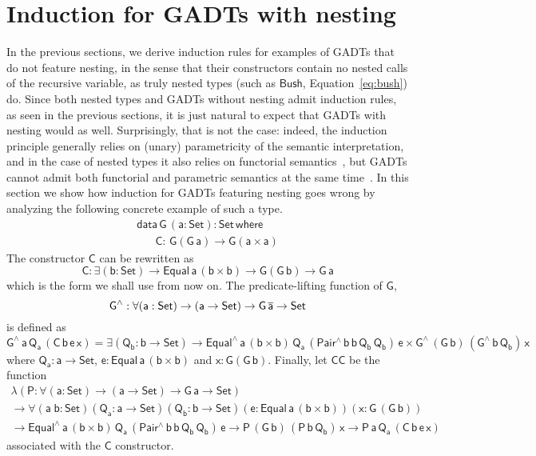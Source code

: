 \documentclass[9pt]{entcs}
\begin{document}
\section{{\color{red}Induction for GADTs with nesting}}\label{sec:GADT-nested}


In the previous sections,
we derive induction rules for examples of GADTs that do not feature nesting,
in the sense that their constructors contain no nested calls of the recursive variable,
as truly nested types (such as $\mathsf{Bush}$, Equation~\ref{eq:bush}) do.
Since both nested types
and GADTs without nesting admit induction rules,
as seen in the previous sections,
it is just natural to expect that GADTs with nesting would as well.
Surprisingly, that is not the case:
indeed, the induction principle generally relies on (unary) parametricity of the semantic interpretation,
and in the case of nested types it also relies on functorial semantics~\cite{jp20},
but GADTs cannot admit both functorial and parametric semantics at the same time~\cite{jgj21}.
In this section we show how induction for GADTs featuring nesting goes wrong
by analyzing the following concrete example of such a type.
\begin{equation}\label{gadt-nested}
\begin{array}{l}
\mathsf{data\, G\,(a : Set) : Set\,where}\\
\mathsf{\;\;\;\;\;\;C :\, G(G\,a) \to G(a \times a)}
\end{array}
\end{equation}
The constructor $\mathsf{C}$ can be rewritten as
\[
\mathsf{C : \exists (b : Set) \to Equal\,a\,(b \times b) \to G(G\,b) \to G\,a}
\]
which is the form we shall use from now on.
The predicate-lifting function of $\mathsf{G}$,
\[
\mathsf{G^{\wedge} : \forall (a : Set) \to (a \to Set) \to G\,\overline{a} \to Set}
\]
is defined as
\[
\mathsf{G^{\wedge}\,a\,Q_a\,(C\,b\,e\,x)
= \exists (Q_b : b \to Set)
\to Equal^{\wedge}\,a\,(b \times b)\,Q_a\,(Pair^{\wedge}\,b\,b\,Q_b\,Q_b)\,e
\times G^{\wedge}\,(G\,b)\,(G^{\wedge}\,b\,Q_b)\,x}
\]
where $\mathsf{Q_a : a \to Set}$, $\mathsf{e : Equal\,a\,(b \times b)}$ and $\mathsf{x : G(G\,b)}$.
Finally, let $\mathsf{CC}$ be the function
\begin{multline*}
\mathsf{\lambda (P : \forall (a : Set) \to (a \to Set) \to G\,a \to Set)} \\
\mathsf{\to \forall (a\;b : Set) (Q_a : a \to Set) (Q_b : b \to Set) (e : Equal\,a\,(b \times b)) (x : G\,(G\,b))} \\
\mathsf{\to Equal^{\wedge}\,a\,(b \times b)\,Q_a\,(Pair^{\wedge}\,b\,b\,Q_b\,Q_b)\,e
	\to P\,(G\,b)\,(P\,b\,Q_b)\,x
	\to P\,a\,Q_a\,(C\,b\,e\,x)}
\end{multline*}
associated with the $\mathsf{C}$ constructor.
\end{document}
